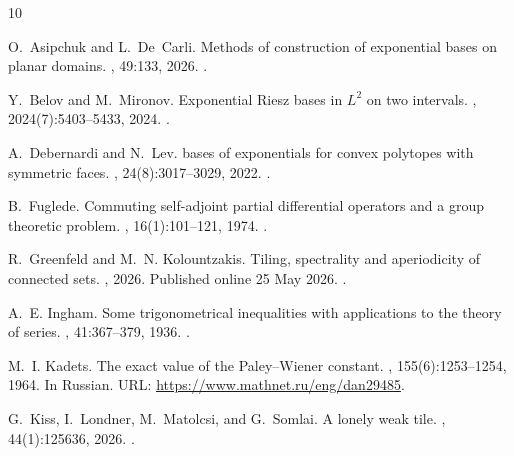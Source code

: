 \documentclass[12pt,reqno,tbtags]{amsart}
\def\L{\mathcal{L}}
\newcommand\1{\mathbbm{1}}
\begin{document}
\begingroup
\def\L{{\fontencoding{T1}\selectfont\symbol{138}}}
\begin{thebibliography}{10}

O.~Asipchuk and L.~De~Carli.
\newblock Methods of construction of exponential bases on planar domains.
,
  49:133, 2026.
\newblock \href {https://doi.org/10.1007/s40840-026-02112-7}
  {}.

Y.~Belov and M.~Mironov.
\newblock Exponential {Riesz} bases in {$L^2$} on two intervals.
, 2024(7):5403--5433,
  2024.
\newblock \href {https://doi.org/10.1093/imrn/rnad125}
  {}.

A.~Debernardi and N.~Lev.
 bases of exponentials for convex polytopes with symmetric
  faces.
, 24(8):3017--3029,
  2022.
\newblock \href {https://doi.org/10.4171/JEMS/1158}
  {}.

B.~Fuglede.
\newblock Commuting self-adjoint partial differential operators and a group
  theoretic problem.
, 16(1):101--121, 1974.
\newblock \href {https://doi.org/10.1016/0022-1236(74)90072-X}
  {}.

R.~Greenfeld and M.~N. Kolountzakis.
\newblock Tiling, spectrality and aperiodicity of connected sets.
, 2026.
\newblock Published online 25 May 2026.
\newblock \href {https://doi.org/10.1007/s11856-026-2916-5}
  {}.

A.~E. Ingham.
\newblock Some trigonometrical inequalities with applications to the theory of
  series.
, 41:367--379, 1936.
\newblock \href {https://doi.org/10.1007/BF01180426}
  {}.

M.~I. Kadets.
\newblock The exact value of the {Paley--Wiener} constant.
, 155(6):1253--1254, 1964.
\newblock In Russian.
\newblock URL: \url{https://www.mathnet.ru/eng/dan29485}.

G.~Kiss, I.~Londner, M.~Matolcsi, and G.~Somlai.
\newblock A lonely weak tile.
, 44(1):125636, 2026.
\newblock \href {https://doi.org/10.1016/j.exmath.2024.125636}
  {}.


\end{thebibliography}
\end{document}
